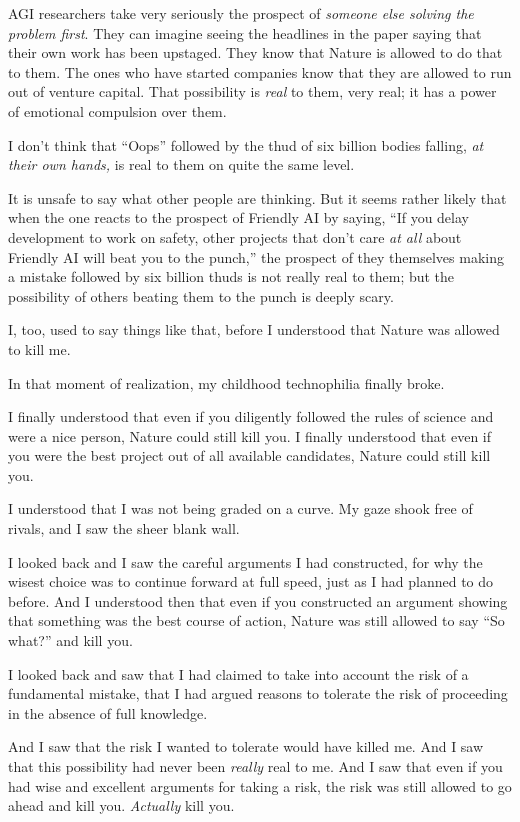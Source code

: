 {
 AGI researchers take very seriously the prospect of
\textit{someone else solving the problem first}. They can imagine
seeing the headlines in the paper saying that their own work has been
upstaged. They know that Nature is allowed to do that to them. The ones
who have started companies know that they are allowed to run out of
venture capital. That possibility is \textit{real} to them, very real;
it has a power of emotional compulsion over them.}

{
 I don't think that
``Oops'' followed by the thud of six
billion bodies falling, \textit{at their own hands,} is real to them on
quite the same level.}

{
 It is unsafe to say what other people are thinking. But it seems
rather likely that when the one reacts to the prospect of Friendly AI
by saying, ``If you delay development to work on
safety, other projects that don't care \textit{at all}
about Friendly AI will beat you to the punch,'' the
prospect of they themselves making a mistake followed by six billion
thuds is not really real to them; but the possibility of others beating
them to the punch is deeply scary.}

{
 I, too, used to say things like that, before I understood that
Nature was allowed to kill me.}

{
 In that moment of realization, my childhood technophilia finally
broke.}

{
 I finally understood that even if you diligently followed the
rules of science and were a nice person, Nature could still kill you. I
finally understood that even if you were the best project out of all
available candidates, Nature could still kill you.}

{
 I understood that I was not being graded on a curve. My gaze shook
free of rivals, and I saw the sheer blank wall.}

{
 I looked back and I saw the careful arguments I had constructed,
for why the wisest choice was to continue forward at full speed, just
as I had planned to do before. And I understood then that even if you
constructed an argument showing that something was the best course of
action, Nature was still allowed to say ``So
what?'' and kill you.}

{
 I looked back and saw that I had claimed to take into account the
risk of a fundamental mistake, that I had argued reasons to tolerate
the risk of proceeding in the absence of full knowledge.}

{
 And I saw that the risk I wanted to tolerate would have killed me.
And I saw that this possibility had never been \textit{really} real to
me. And I saw that even if you had wise and excellent arguments for
taking a risk, the risk was still allowed to go ahead and kill you.
\textit{Actually} kill you.}

